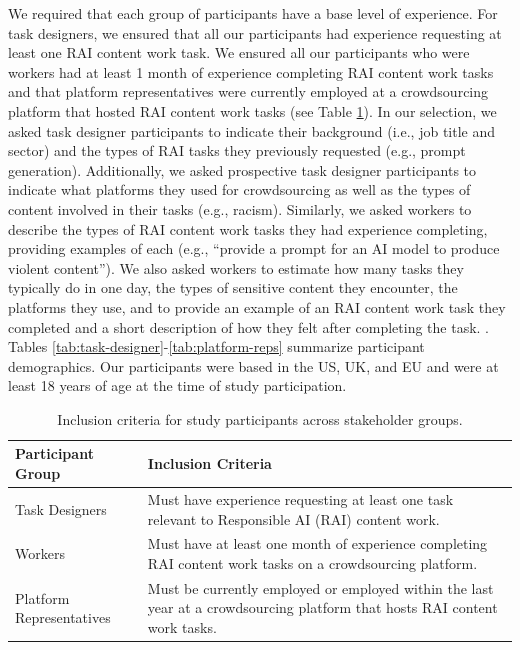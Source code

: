 We required that each group of participants have a base level of experience. For task designers, we ensured that all our participants had experience requesting at least one RAI content work task. We ensured all our participants who were workers had at least 1 month of experience completing RAI content work tasks and that platform representatives were currently employed at a crowdsourcing platform that hosted RAI content work tasks (see Table \ref{tab:inclusion-criteria}). In our selection, we asked task designer participants to indicate their background (i.e., job title and sector) and the types of RAI tasks they previously requested (e.g., prompt generation). Additionally, we asked prospective task designer participants to indicate what platforms they used for crowdsourcing as well as the types of content involved in their tasks (e.g., racism). Similarly, we asked workers to describe the types of RAI content work tasks they had experience completing, providing examples of each (e.g., ``provide a prompt for an AI model to produce violent content''). We also asked workers to estimate how many tasks they typically do in one day, the types of sensitive content they encounter, the platforms they use, and to provide an example of an RAI content work task they completed and a short description of how they felt after completing the task. . Tables \ref{tab:task-designer}-\ref{tab:platform-reps} summarize participant demographics. Our participants were based in the US, UK, and EU and were at least 18 years of age at the time of study participation. 


\begin{table}[ht]
\fontsize{7pt}{10pt}\selectfont
\centering
\begin{tabular}{p{2cm} p{5cm}}
\hline
\textbf{Participant Group} & \textbf{Inclusion Criteria} \\
\hline
Task Designers & Must have experience requesting at least one task relevant to Responsible AI (RAI) content work. \\
\hline
Workers & Must have at least one month of experience completing RAI content work tasks on a crowdsourcing platform. \\
\hline
Platform Representatives & Must be currently employed or employed within the last year at a crowdsourcing platform that hosts RAI content work tasks. \\
\hline
\end{tabular}
\caption{Inclusion criteria for study participants across stakeholder groups.}
\label{tab:inclusion-criteria}
\end{table}


